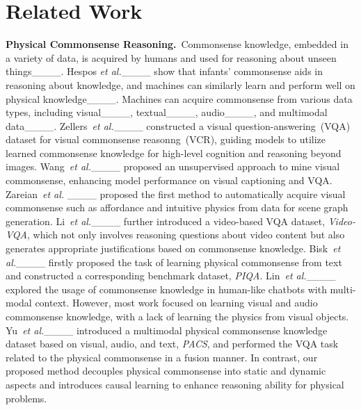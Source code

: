 \section{Related Work}
{\bf Physical Commonsense Reasoning.}~Commonsense knowledge, embedded in a variety of data, is acquired by humans and used for reasoning about unseen things____. Hespos {\it et al.}____ show that infants' commonsense aids in reasoning about knowledge, and machines can similarly learn and perform well on physical knowledge____. Machines can acquire commonsense from various data types, including visual____, textual____, audio____, and multimodal data____. 
Zellers~{\it et al.}____ constructed a visual question-answering~(VQA) dataset for visual commonsense reasonng~(VCR), guiding models to utilize learned commonsense knowledge for high-level cognition and reasoning beyond images. Wang~{\it et al.}____ proposed an unsupervised approach to mine visual commonsense, enhancing model performance on visual captioning and VQA. Zareian~{\it et al.} ____ proposed the first method to automatically acquire visual commonsense such as affordance and intuitive physics from data for scene graph generation. Li~{\it et al.}____ further introduced a video-based VQA dataset, \emph{Video-VQA}, which not only involves reasoning questions about video content but also generates appropriate justifications based on commonsense knowledge. Bisk~{\it et al.}____ firstly proposed the task of learning physical commonsense from text and constructed a corresponding benchmark dataset, \emph{PIQA}. Lin~{\it et al.}____ explored the usage of commonsense knowledge in human-like chatbots with multi-modal context. However, most work focused on learning visual and audio commonsense knowledge, with a lack of learning the physics from visual objects. Yu~{\it et al.}____ introduced a multimodal physical commonsense knowledge dataset based on visual, audio, and text, \emph{PACS}, and performed the VQA task related to the physical commonsense in a fusion manner. In contrast, our proposed method decouples physical commonsense into static and dynamic aspects and introduces causal learning to enhance reasoning ability for physical problems. 

